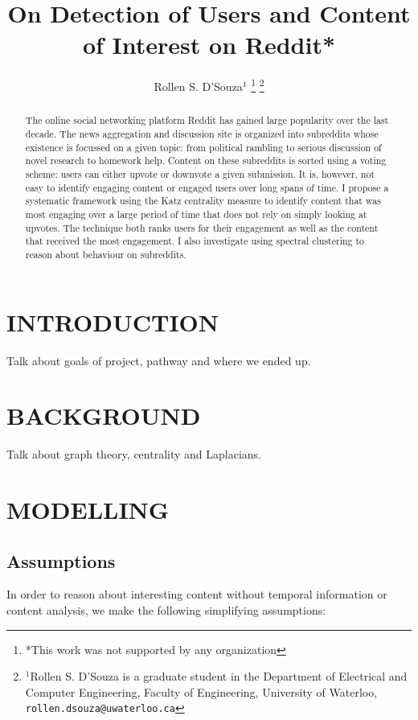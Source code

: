 \documentclass[letterpaper, 10 pt, conference]{ieeeconf}
\title{\LARGE \bf
On Detection of Users and Content of Interest on Reddit*
}
\author{Rollen S. D'Souza$^{1}$%
  \thanks{*This work was not supported by any organization}%
  \thanks{$^{1}$Rollen S. D'Souza is a graduate student in the
    Department of Electrical and Computer Engineering,
    Faculty of Engineering,
    University of Waterloo,
    \texttt{rollen.dsouza@uwaterloo.ca}
  }%
}
\theoremstyle{definition}
\newcommand{\red}{\color{red}}
\begin{document}
\maketitle
\thispagestyle{empty}
\pagestyle{empty}


\begin{abstract}
  The online social networking platform Reddit has gained large popularity over the last decade. The news aggregation and discussion site is organized into subreddits whose existence is focussed on a given topic: from political rambling to serious discussion of novel research to homework help. Content on these subreddits is sorted using a voting scheme: users can either upvote or downvote a given submission. It is, however, not easy to identify engaging content or engaged users over long spans of time. I propose a systematic framework using the Katz centrality measure to identify content that was most engaging over a large period of time that does not rely on simply looking at upvotes. The technique both ranks users for their engagement as well as the content that received the most engagement. I also investigate using spectral clustering to reason about behaviour on subreddits.
\end{abstract}


\section{INTRODUCTION}
{\red Talk about goals of project, pathway and where we ended up.}

\section{BACKGROUND}
{\red Talk about graph theory, centrality and Laplacians.}

\section{MODELLING}

\subsection{Assumptions}
In order to reason about interesting content without temporal information or content analysis, we make the following simplifying assumptions:
\end{document}
